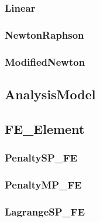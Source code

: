 \pagebreak \subsubsection{Linear}


\pagebreak \subsubsection{NewtonRaphson}


\pagebreak \subsubsection{ModifiedNewton}


%

\pagebreak \subsection{AnalysisModel}


\pagebreak \subsection{FE\_Element}


\pagebreak \subsubsection{PenaltySP\_FE}


\pagebreak \subsubsection{PenaltyMP\_FE}



\pagebreak \subsubsection{LagrangeSP\_FE}


